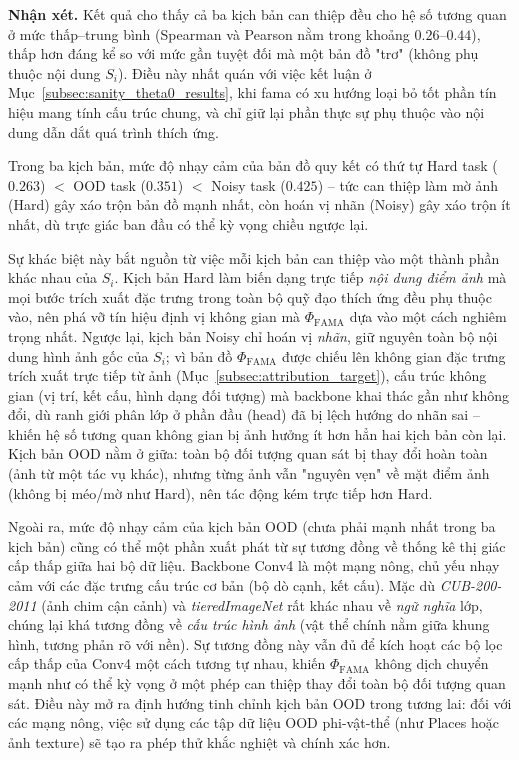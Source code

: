 \textbf{Nhận xét.} Kết quả cho thấy cả ba kịch bản can thiệp đều cho hệ số tương quan ở mức thấp--trung bình (Spearman và Pearson nằm trong khoảng $0.26$--$0.44$), thấp hơn đáng kể so với mức gần tuyệt đối mà một bản đồ "trơ" (không phụ thuộc nội dung $S_i$). Điều này nhất quán với việc kết luận ở Mục~\ref{subsec:sanity_theta0_results}, khi \acrshort{fama} có xu hướng loại bỏ tốt phần tín hiệu mang tính cấu trúc chung, và chỉ giữ lại phần thực sự phụ thuộc vào nội dung dẫn dắt quá trình thích ứng.

Trong ba kịch bản, mức độ nhạy cảm của bản đồ quy kết có thứ tự Hard task ($0.263$) $<$ OOD task ($0.351$) $<$ Noisy task ($0.425$) -- tức can thiệp làm mờ ảnh (Hard) gây xáo trộn bản đồ mạnh nhất, còn hoán vị nhãn (Noisy) gây xáo trộn ít nhất, dù trực giác ban đầu có thể kỳ vọng chiều ngược lại.

Sự khác biệt này bắt nguồn từ việc mỗi kịch bản can thiệp vào một thành phần khác nhau của $S_i$. Kịch bản Hard làm biến dạng trực tiếp \emph{nội dung điểm ảnh} mà mọi bước trích xuất đặc trưng trong toàn bộ quỹ đạo thích ứng đều phụ thuộc vào, nên phá vỡ tín hiệu định vị không gian mà $\Phi_{\text{FAMA}}$ dựa vào một cách nghiêm trọng nhất. Ngược lại, kịch bản Noisy chỉ hoán vị \emph{nhãn}, giữ nguyên toàn bộ nội dung hình ảnh gốc của $S_i$; vì bản đồ $\Phi_{\text{FAMA}}$ được chiếu lên không gian đặc trưng trích xuất trực tiếp từ ảnh (Mục~\ref{subsec:attribution_target}), cấu trúc không gian (vị trí, kết cấu, hình dạng đối tượng) mà backbone khai thác gần như không đổi, dù ranh giới phân lớp ở phần đầu (head) đã bị lệch hướng do nhãn sai -- khiến hệ số tương quan không gian bị ảnh hưởng ít hơn hẳn hai kịch bản còn lại. Kịch bản OOD nằm ở giữa: toàn bộ đối tượng quan sát bị thay đổi hoàn toàn (ảnh từ một tác vụ khác), nhưng từng ảnh vẫn "nguyên vẹn" về mặt điểm ảnh (không bị méo/mờ như Hard), nên tác động kém trực tiếp hơn Hard.

Ngoài ra, mức độ nhạy cảm của kịch bản OOD (chưa phải mạnh nhất trong ba kịch bản) cũng có thể một phần xuất phát từ sự tương đồng về thống kê thị giác cấp thấp giữa hai bộ dữ liệu. Backbone Conv4 là một mạng nông, chủ yếu nhạy cảm với các đặc trưng cấu trúc cơ bản (bộ dò cạnh, kết cấu). Mặc dù \emph{CUB-200-2011} (ảnh chim cận cảnh) và \emph{tieredImageNet} rất khác nhau về \emph{ngữ nghĩa} lớp, chúng lại khá tương đồng về \emph{cấu trúc hình ảnh} (vật thể chính nằm giữa khung hình, tương phản rõ với nền). Sự tương đồng này vẫn đủ để kích hoạt các bộ lọc cấp thấp của Conv4 một cách tương tự nhau, khiến $\Phi_{\text{FAMA}}$ không dịch chuyển mạnh như có thể kỳ vọng ở một phép can thiệp thay đổi toàn bộ đối tượng quan sát. Điều này mở ra định hướng tinh chỉnh kịch bản OOD trong tương lai: đối với các mạng nông, việc sử dụng các tập dữ liệu OOD phi-vật-thể (như Places hoặc ảnh texture) sẽ tạo ra phép thử khắc nghiệt và chính xác hơn.

